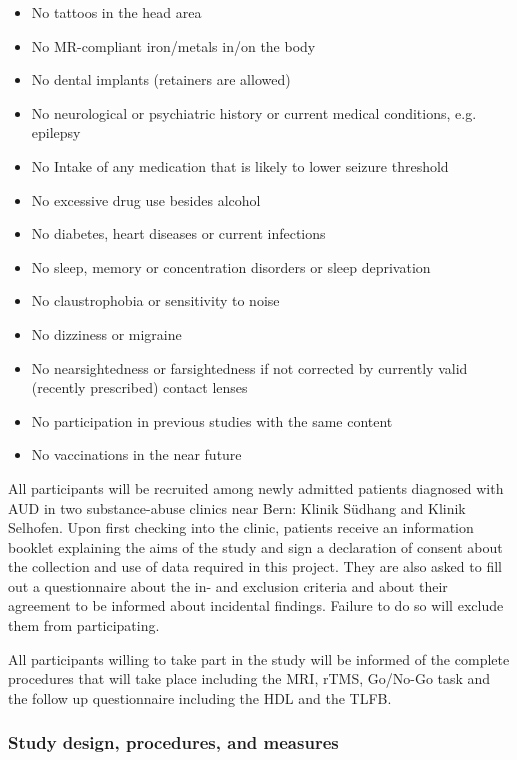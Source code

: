 \documentclass[12pt]{article}
\begin{document}
\begin{itemize}
\item No tattoos in the head area 
\item No MR-compliant iron/metals in/on the body
\item No dental implants (retainers are allowed)
\item No neurological or psychiatric history or current medical conditions, e.g. epilepsy
\item No Intake of any medication that is likely to lower seizure threshold
\item No excessive drug use besides alcohol
\item No diabetes, heart diseases or current infections
\item No sleep, memory or concentration disorders or sleep deprivation
\item No claustrophobia or sensitivity to noise
\item No dizziness or migraine 
\item No nearsightedness or farsightedness if not corrected by currently valid (recently prescribed) contact lenses
\item No participation in previous studies with the same content  
\item No vaccinations in the near future 
\end{itemize}

All participants will be recruited among newly admitted patients diagnosed with AUD in two substance-abuse clinics near Bern: Klinik Südhang and Klinik Selhofen. Upon first checking into the clinic, patients receive an information booklet explaining the aims of the study and sign a declaration of consent about the collection and use of data required in this project. They are also asked to fill out a questionnaire about the in- and exclusion criteria and about their agreement to be informed about incidental findings. Failure to do so will exclude them from participating.

All participants willing to take part in the study will be informed of the complete procedures that will take place including the MRI, rTMS, Go/No-Go task and the follow up questionnaire including the HDL and the TLFB.

\subsubsection{Study design, procedures, and measures}
\end{document}
